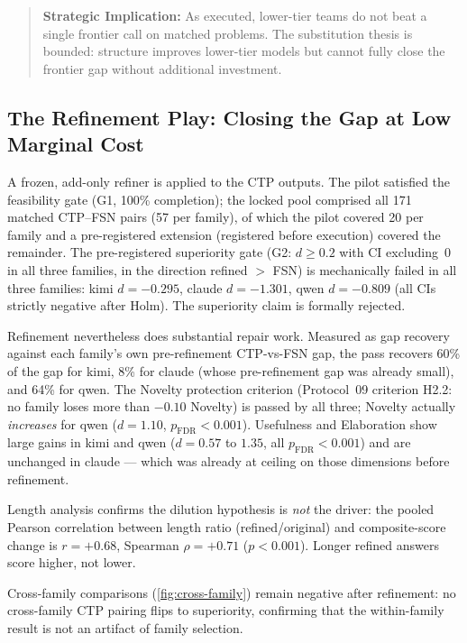 \documentclass[12pt,a4paper]{article}
\begin{document}
\begin{quote}
\textbf{Strategic Implication:} As executed, lower-tier teams do not beat a single
frontier call on matched problems. The substitution thesis is bounded: structure
improves lower-tier models but cannot fully close the frontier gap without additional
investment.
\end{quote}

\subsection{The Refinement Play: Closing the Gap at Low Marginal Cost}\label{sec:refinement}

A frozen, add-only refiner is applied to the CTP outputs. The pilot satisfied
the feasibility gate (G1, 100\% completion); the locked pool comprised all 171
matched CTP--FSN pairs (57 per family), of which the pilot covered 20 per
family and a pre-registered extension (registered before execution) covered
the remainder. The pre-registered superiority gate (G2: $d \ge 0.2$ with CI
excluding~0 in all three families, in the direction refined $>$ FSN) is
mechanically failed in all three families: kimi $d = -0.295$, claude $d =
-1.301$, qwen $d = -0.809$ (all CIs strictly negative after Holm). The
superiority claim is formally rejected.

Refinement nevertheless does substantial repair work. Measured as gap recovery
against each family's own pre-refinement CTP-vs-FSN gap, the pass recovers 60\%
of the gap for kimi, 8\% for claude (whose pre-refinement gap was already
small), and 64\% for qwen. The Novelty protection criterion (Protocol~09
criterion H2.2: no family loses more than $-0.10$ Novelty) is passed by all
three; Novelty actually \emph{increases} for qwen ($d = 1.10$,
$p_{\mathrm{FDR}} < 0.001$). Usefulness
and Elaboration show large gains in kimi and qwen ($d = 0.57$ to $1.35$, all
$p_{\mathrm{FDR}} < 0.001$) and are unchanged in claude --- which was already at
ceiling on those dimensions before refinement.

Length analysis confirms the dilution hypothesis is \emph{not} the driver: the
pooled Pearson correlation between length ratio (refined/original) and
composite-score change is $r = +0.68$, Spearman $\rho = +0.71$ ($p < 0.001$).
Longer refined answers score higher, not lower.

Cross-family comparisons (\cref{fig:cross-family}) remain negative after
refinement: no cross-family CTP pairing flips to superiority, confirming that
the within-family result is not an artifact of family selection.
\end{document}
